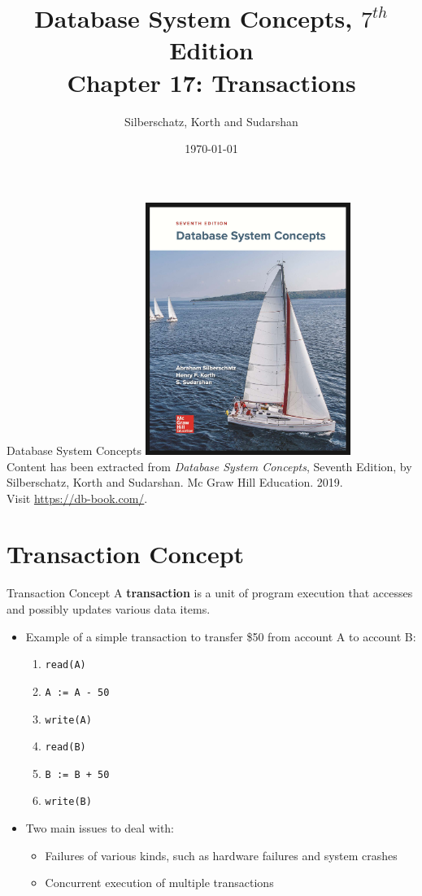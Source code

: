 \documentclass{beamer}
\title[Chapter 17]{Database System Concepts, $7^{th}$ Edition \\ Chapter 17: Transactions}
\author{Silberschatz, Korth and Sudarshan}
\date{\today}
\begin{document}
\frame{\titlepage}

\begin{frame}{Database System Concepts}
    \centering
    \includegraphics[width=0.5\textwidth]{figures/book_cover.jpg} \\
    \vspace{5mm}
    {
        \tiny
        Content has been extracted from \textit{Database System Concepts}, Seventh Edition, by Silberschatz, Korth and Sudarshan. Mc Graw Hill Education. 2019.\\
        Visit \url{https://db-book.com/}.\\
    }
\end{frame}

\section{Transaction Concept}

\begin{frame}{Transaction Concept}
    A \textbf{transaction} is a unit of program execution that accesses and possibly updates various data items.
    \begin{itemize}
        \item Example of a simple transaction to transfer \$50 from account A to account B:
        \begin{enumerate}
            \item \texttt{read(A)}
            \item \texttt{A := A - 50}
            \item \texttt{write(A)}
            \item \texttt{read(B)}
            \item \texttt{B := B + 50}
            \item \texttt{write(B)}
        \end{enumerate}
        \item Two main issues to deal with:
        \begin{itemize}
            \item Failures of various kinds, such as hardware failures and system crashes
            \item Concurrent execution of multiple transactions
        \end{itemize}
    \end{itemize}
\end{frame}
\end{document}
